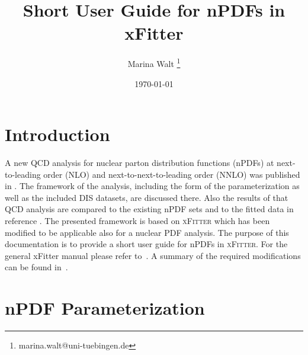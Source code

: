 \documentclass{article}
\title{Short User Guide for nPDFs in xFitter}
\author[1]{Marina Walt \thanks{marina.walt@uni-tuebingen.de}}
\affil[1]{Institute for Theoretical Physics, University of T\"ubingen, Auf der Morgenstelle 14, 72076 T\"ubingen, Germany}
\date{\today} %
\begin{document}
\maketitle
\tableofcontents


\section{Introduction}

A new QCD analysis for nuclear parton distribution functions (nPDFs) at next-to-leading order (NLO) and next-to-next-to-leading order (NNLO) was published in \cite{Walt:2019slu}. The framework of the analysis, including the form of the parameterization as well as the included DIS datasets, are discussed there. Also the results of that QCD analysis are compared to the existing nPDF sets and to the fitted data in reference \cite{Walt:2019slu}. The presented framework is based on \textsc{xFitter} \cite{Zenaiev:2016jnq,Bertone:2017tig} which has been modified to be applicable also for a nuclear PDF analysis. The purpose of this documentation is to provide a short user guide for nPDFs in \textsc{xFitter}. For the general xFitter manual please refer to~\cite{xfitter-manual}. A summary of the required modifications can be found in~\cite{Walt:2019slu}.

\clearpage
\section{nPDF Parameterization} 
\end{document}
